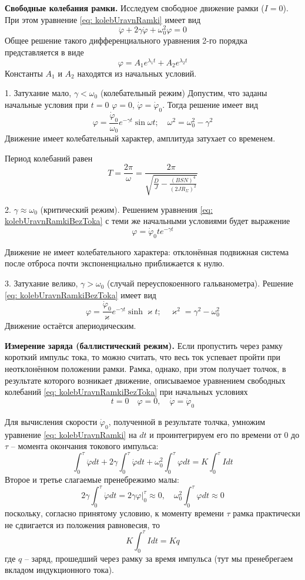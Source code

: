 \documentclass[a4paper,12pt]{article}
\begin{document}
\textbf{Свободные колебания рамки.} Исследуем свободное движение рамки ($I = 0$). При этом уравнение \eqref{eq: kolebUravnRamki} имеет вид
\begin{equation}\label{eq: kolebUravnRamkiBezToka}
    \ddot{\varphi} + 2\gamma \dot{\varphi} + \omega_0^2 \varphi = 0
\end{equation}
Общее решение такого дифференциального уравнения 2-го порядка представляется в виде 
\[\varphi = A_1 e^{\lambda_1 t} + A_2 e^{\lambda_2 t}\]
Константы $A_1 \text{ и } A_2$ находятся из начальных условий.

1. Затухание мало, $\gamma < \omega_0$ (колебательный режим)
Допустим, что заданы начальные условия при $t = 0$ \quad $\varphi = 0$, \quad $\dot\varphi = \dot\varphi_0$. Тогда решение имеет вид 
\[\varphi = \frac{\dot\varphi_0}{\omega_0} e^{-\gamma t} \sin{\omega t}; \quad \omega^2 = \omega_0^2 - \gamma^2\]
Движение имеет колебательный характер, амплитуда затухает со временем.

Период колебаний равен
\[T = \frac{2\pi}{\omega} = \frac{2 \pi}{\sqrt{\frac{D}{J} - \frac{(B S N)^4}{(2 J R_\Sigma)^2}}}\]
\newpage

2. $\gamma \approx \omega_0$ (критический режим). Решением уравнения \eqref{eq: kolebUravnRamkiBezToka} с теми же начальными условиями будет выражение 
\[\varphi = \dot\varphi_0 t e^{-\gamma t}\]

Движение не имеет колебательного характера: отклонённая подвижная система после отброса почти экспоненциально приближается к нулю.

3. Затухание велико, $\gamma > \omega_0$ (случай переуспокоенного гальванометра). Решение \eqref{eq: kolebUravnRamkiBezToka} имеет вид 
\[\varphi = \frac{\dot\varphi_0}{\varkappa} e^{-\gamma t} \sinh{\varkappa t}; \quad \varkappa^2 = \gamma^2 - \omega_0^2\]
Движение остаётся апериодическим.

\textbf{Измерение заряда (баллистический режим).} Если пропустить через рамку
короткий импульс тока, то можно считать, что весь ток успевает пройти при неотклонённом положении рамки. Рамка, однако, при этом получает толчок, в результате
которого возникает движение, описываемое уравнением свободных колебаний \eqref{eq: kolebUravnRamkiBezToka} при начальных условиях
\[t = 0 \quad \varphi = 0, \quad \dot\varphi = \dot\varphi_0\]

Для вычисления скорости $\dot\varphi_0$, полученной в результате толчка, умножим уравнение \eqref{eq: kolebUravnRamki} на $dt$ и проинтегрируем его по времени от 0 до $\tau$ --  момента окончания токового импульса:
\[\int_0^\tau \ddot{\varphi} dt + 2 \gamma \int_0^\tau \dot\varphi dt + \omega_0^2 \int_0^\tau \varphi dt = K \int_0^\tau I dt\]
Второе и третье слагаемые пренебрежимо малы:
\[2 \gamma \int_0^\tau \dot\varphi dt = 2 \gamma \varphi \bigg|_0^\tau \approx 0, \quad \omega_0^2 \int_0^\tau \varphi dt \approx 0\]
поскольку, согласно принятому условию, к моменту времени $\tau$ рамка практически не сдвигается из положения равновесия, то
\[ K \int_0^\tau I dt = K q\]
где $q$ -- заряд, прошедший через рамку за время импульса (тут мы пренебрегаем вкладом индукционного тока).
\end{document}
